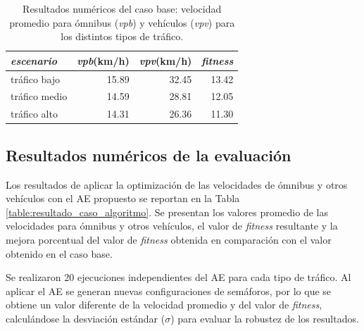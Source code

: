 \begin{table}[H]
	\renewcommand{\arraystretch}{1.0}
\renewcommand{\tabcolsep}{12pt}
	\caption[Resultados numéricos del caso base.]{Resultados numéricos del caso base: velocidad promedio para ómnibus (\textit{vpb}) y vehículos (\textit{vpv}) para los distintos tipos de tráfico.}
	\label{table:resultado_caso_base}
	\centering
	\begin{tabular}{lrrr}
		\toprule
		\textit{escenario}  &
		\textit{vpb}(km/h) &
		\textit{vpv}(km/h) &
		\textit{fitness} \\
		\midrule
		tráfico bajo & 15.89  & 32.45& 13.42\\
		tráfico medio & 14.59  & 28.81& 12.05\\
		tráfico alto & 14.31  & 26.36& 11.30\\
		\bottomrule
	\end{tabular}
\end{table}
 


\subsection{Resultados numéricos de la evaluación }

Los resultados de aplicar la optimización de las velocidades de ómnibus y otros vehículos con el AE propuesto se reportan en la Tabla \ref{table:resultado_caso_algoritmo}. Se presentan los valores promedio de las velocidades para ómnibus y otros vehículos, el valor de \emph{fitness} resultante y la mejora porcentual del valor de \emph{fitness} obtenida en comparación con el valor obtenido en el caso base.

Se realizaron 20 ejecuciones independientes del AE para cada tipo de tráfico. Al aplicar el AE se generan nuevas configuraciones de semáforos, por lo que se obtiene un valor diferente de la velocidad promedio y del valor de \emph{fitness}, calculándose la desviación estándar ($\sigma$) para evaluar la robustez de los resultados.

